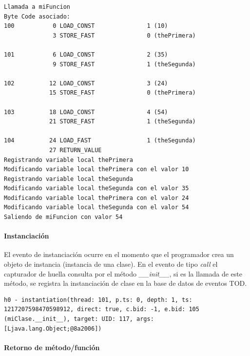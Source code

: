 \documentclass[12pt,legalpaper]{report}
\begin{document}
\begin{singlespace}
\begin{lstlisting}[style=consola,numbers=none]
Llamada a miFuncion
Byte Code asociado:
100           0 LOAD_CONST               1 (10)
              3 STORE_FAST               0 (thePrimera)

101           6 LOAD_CONST               2 (35)
              9 STORE_FAST               1 (theSegunda)

102          12 LOAD_CONST               3 (24)
             15 STORE_FAST               0 (thePrimera)

103          18 LOAD_CONST               4 (54)
             21 STORE_FAST               1 (theSegunda)

104          24 LOAD_FAST                1 (theSegunda)
             27 RETURN_VALUE        
Registrando variable local thePrimera
Modificando variable local thePrimera con el valor 10
Registrando variable local theSegunda
Modificando variable local theSegunda con el valor 35
Modificando variable local thePrimera con el valor 24
Modificando variable local theSegunda con el valor 54
Saliendo de miFuncion con valor 54
\end{lstlisting}
\end{singlespace}			
					
				\paragraph{Instanciación}	
				
El evento de instanciación ocurre en el momento que el programador crea un objeto de instancia (instancia de una clase).  En el evento de tipo \textit{call} el capturador de huella consulta por el método \textit{\_\_init\_\_}, si es la llamada de este método, se registra la instanciación de clase en la base de datos de eventos TOD.

\begin{singlespace}
\begin{lstlisting}[style=consola,numbers=none]
h0 - instantiation(thread: 101, p.ts: 0, depth: 1, ts: 1217207598470598912, direct: true, c.bid: -1, e.bid: 105 (miClase.__init__), target: UID: 117, args: [Ljava.lang.Object;@8a2006])
\end{lstlisting}
\end{singlespace}					
				
				
	 			      \paragraph{Retorno de método/función}
				      
\end{document}
